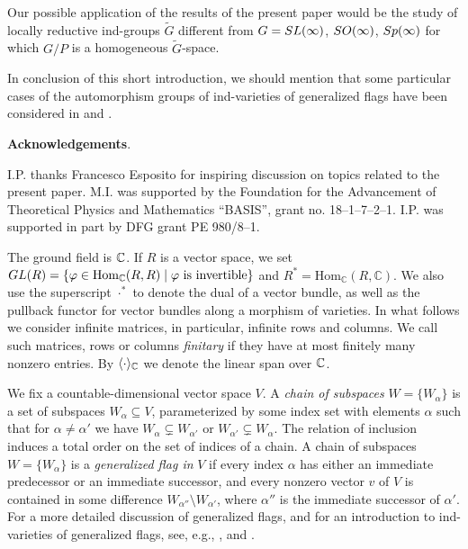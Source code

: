 \documentclass[11pt, a4paper]{article}
\begin{document}
Our possible application of the results of the present paper would be the study of locally reductive ind-groups $\widetilde{G}$ different from $G=SL(\infty)$, $SO(\infty)$, $Sp(\infty)$ for which $G/P$ is a homogeneous $\widetilde{G}$-space.

In conclusion of this short introduction, we should mention that some particular cases of the automorphism groups of ind-varieties of generalized flags have been considered in \cite{Penkov} and \cite{Tarigradschi}.

\textbf{Acknowledgements}. 

 I.P. thanks Francesco Esposito for inspiring discussion on topics related to the present paper. M.I. was supported by the Foundation for the Advancement of Theoretical Physics and Mathematics ``BASIS'', grant no. 18--1--7--2--1. I.P. was supported in part by DFG grant PE 980/8--1.


\label{section:brief_background}

The ground field is $\mathbb{C}$. If $R$ is a vector space, we set $GL(R)=\{ \varphi\in \mathrm{Hom}_{\mathbb{C}}(R,R)\mid \varphi\text{ is invertible}\}$ and $R^*=\mathrm{Hom}_{\mathbb{C}}(R,\mathbb{C})$. We also use the superscript $\cdot^*$ to denote the dual of a vector bundle, as well as the pullback functor for vector bundles along a morphism of varieties. In what follows we consider infinite matrices, in particular, infinite rows and columns. We call such matrices, rows or columns \emph{finitary} if they have at most finitely many nonzero entries. By $\langle \cdot \rangle_{\mathbb{C}}$ we denote the linear span over $\mathbb{C}$.

We fix a countable-dimensional vector space $V$. A \emph{chain of subspaces} $W=\{W_{\alpha}\}$ is a set of subspaces $W_{\alpha}\subseteq V$, parameterized by some index set with elements $\alpha$ such that for $\alpha\neq \alpha'$ we have $W_{\alpha}\varsubsetneq W_{\alpha'}$ or $W_{\alpha'}\varsubsetneq W_{\alpha}$. The relation of inclusion induces a total order on the set of indices of a chain. A chain of subspaces  $W=\{W_{\alpha}\}$ is a \emph{generalized flag in} $V$ if every index $\alpha$ has either an immediate predecessor or an immediate successor, and every nonzero vector $v$ of $V$ is contained in some difference $W_{\alpha''}\setminus W_{\alpha'}$, where $\alpha''$ is the immediate successor of $\alpha'$. For a more detailed discussion of generalized flags, and for an introduction to ind-varieties of generalized flags, see, e.g., \cite{DimitrovPenkov}, \cite{IgnatyevPenkov} and \cite{PenkovTikhomirov2}.
\end{document}
